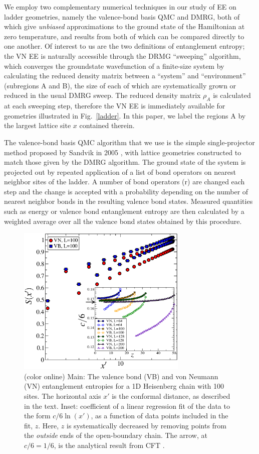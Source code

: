 \documentclass[prl,aps,twocolumn,floatfix,amsmath,amssymb,superscriptaddress,tightenlines]{revtex4}
\begin{document}
We employ two complementary numerical techniques in our study of EE on ladder geometries, namely the valence-bond basis QMC and DMRG, both of which give {\it unbiased} approximations to the ground state of the Hamiltonian at zero temperature, and results from both of which can be compared directly to one another.  Of interest to us are the two definitions of entanglement entropy; the VN EE is naturally accessible through the DRMG ``sweeping'' algorithm, which converges the groundstate wavefunction of a finite-size system by calculating the reduced density matrix between a ``system'' and ``environment'' (subregions A and B), the size of each of which are systematically grown or reduced in the usual DMRG sweep.  The reduced density matrix $\rho_A$ is calculated at each sweeping step, therefore the VN EE is immediately available for geometries illustrated in Fig.~\ref{ladder}.  In this paper, we label the regions A by the largest lattice site $x$ contained therein.

The valence-bond basis QMC algorithm that we use is the simple single-projector method proposed by Sandvik in 2005 \cite{Sandvik}, with lattice geometries constructed to match those given by the DMRG algorithm.  The ground state of the system is projected out by repeated application of a list of bond operators on nearest neighbor sites of the ladder.  A number of bond operators (r) are changed each step and the change is accepted with a probability depending on the number of nearest neighbor bonds in the resulting valence bond states.  Measured quantities such as energy or valence bond entanglement entropy are then calculated by a weighted average over all the valence bond states obtained by this procedure.

\begin{figure}
{
\includegraphics[width=3.2in]{fig1_inset.eps}
\caption{(color online) Main: The valence bond (VB) and von Neumann (VN) entanglement entropies for a 1D Heisenberg chain with 100 sites.  The horizontal axis $x'$ is the conformal distance, as described in the text.  Inset:  coefficient of a linear regression fit of the data to the form $c/6 \ln(x')$, as a function of data points included in the fit, $z$.  Here, $z$ is systematically decreased by removing points from the {\it outside} ends of the open-boundary chain.   The arrow, at $c/6=1/6$, is the analytical result from CFT \cite{Cardy}.
\label{1D}}}
\end{figure}
\end{document}
